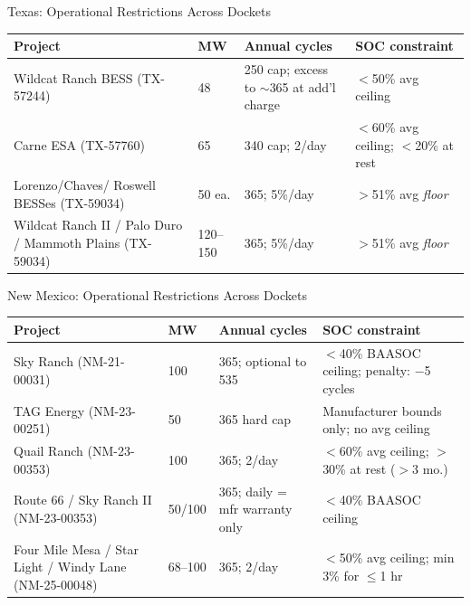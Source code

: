 \documentclass{beamer}
\begin{document}
\begin{frame}{Texas: Operational Restrictions Across Dockets}
\footnotesize
\begin{tabular}{p{3.5cm} p{0.9cm} p{2.0cm} p{2.5cm}}
\toprule
\textbf{Project} & \textbf{MW} & \textbf{Annual cycles} & \textbf{SOC constraint} \\
\midrule
Wildcat Ranch BESS (TX-57244) & 48 & 250 cap; excess to ${\sim}$365 at add'l charge & $<$50\% avg ceiling \\
\addlinespace
Carne ESA (TX-57760) & 65 & 340 cap; 2/day & $<$60\% avg ceiling; $<$20\% at rest \\
\addlinespace
Lorenzo/Chaves/ Roswell BESSes (TX-59034) & 50 ea. & 365; 5\%/day & $>$51\% avg \textit{floor}\\
\addlinespace
Wildcat Ranch II / Palo Duro / Mammoth Plains (TX-59034) & 120--150 & 365; 5\%/day & $>$51\% avg \textit{floor} \\
\bottomrule
\end{tabular}


\end{frame}

\begin{frame}{New Mexico: Operational Restrictions Across Dockets}
\footnotesize
\begin{tabular}{p{3.5cm} p{0.8cm} p{1.9cm} p{3cm}}
\toprule
\textbf{Project} & \textbf{MW} & \textbf{Annual cycles} & \textbf{SOC constraint} \\
\midrule
Sky Ranch (NM-21-00031) & 100 & 365; optional to 535 & $<$40\% BAASOC ceiling; penalty: $-$5 cycles  \\
\addlinespace
TAG Energy (NM-23-00251) & 50 & 365 hard cap & Manufacturer bounds only; no avg ceiling  \\
\addlinespace
Quail Ranch (NM-23-00353) & 100 & 365; 2/day & $<$60\% avg ceiling; $>$30\% at rest ($>$3 mo.)  \\
\addlinespace
Route 66 / Sky Ranch II (NM-23-00353) & 50/100 & 365; daily = mfr warranty only & $<$40\% BAASOC ceiling  \\
\addlinespace
Four Mile Mesa / Star Light / Windy Lane (NM-25-00048) & 68--100 & 365; 2/day & $<$50\% avg ceiling; min 3\% for $\leq$1 hr \\
\bottomrule
\end{tabular}
\end{frame}
\end{document}
